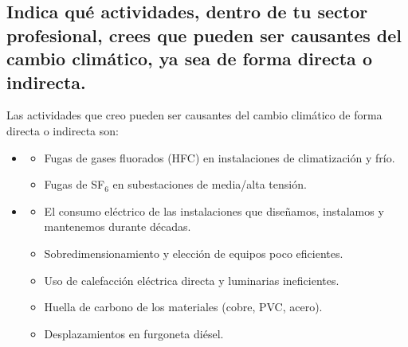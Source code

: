 
\subsection*{Indica qué actividades, dentro de tu sector profesional, crees que pueden ser causantes del cambio climático, ya sea de forma directa o indirecta.}
\begin{solution}
	\vspace{1em}
	Las actividades que creo pueden ser causantes del cambio climático de forma directa o indirecta son:
	\vspace{1em}
	\begin{itemize}[label=$\bullet$]
		\item{}
			\begin{itemize}[label=$\circ$]
				\item{Fugas de gases fluorados (HFC) en instalaciones de climatización y frío.}
				\item{Fugas de SF$_6$ en subestaciones de media/alta tensión.}
			\end{itemize}

		\vspace{1em}
		\item{}
			\begin{itemize}[label=$\circ$]
				\item{El consumo eléctrico de las instalaciones que diseñamos, instalamos y mantenemos durante décadas.}
				\item{Sobredimensionamiento y elección de equipos poco eficientes.}
				\item{Uso de calefacción eléctrica directa y luminarias ineficientes.}
				\item{Huella de carbono de los materiales (cobre, PVC, acero).}
				\item{Desplazamientos en furgoneta diésel.}
			\end{itemize}
	\end{itemize}
	\vspace{1em}
\end{solution}
